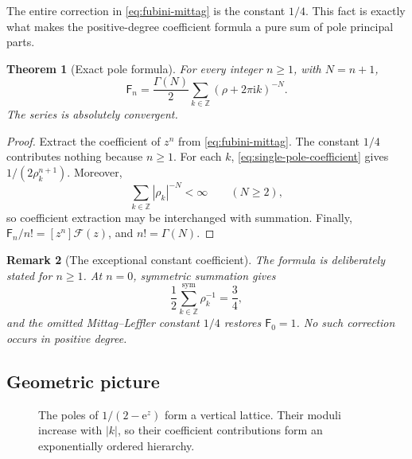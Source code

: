 \documentclass[11pt,oneside]{article}
\numberwithin{equation}{section}
\newtheorem{theorem}{Theorem}[section]
\newtheorem{remark}[theorem]{Remark}
\newcommand{\e}{\mathrm e}
\newcommand{\ii}{\mathrm i}
\newcommand{\Z}{\mathbb Z}
\newcommand{\Fub}{\mathsf F}
\newcommand{\Coeff}[2]{[#1^{#2}]}
\newcommand{\abs}[1]{\left|#1\right|}
\newcommand{\sym}{\mathrm{sym}}
\begin{document}
The entire correction in \cref{eq:fubini-mittag} is the constant \(1/4\).  This fact is exactly what makes the positive-degree coefficient formula a pure sum of pole principal parts.

\begin{theorem}[Exact pole formula]
\label{thm:exact-pole-formula}
For every integer \(n\ge1\), with \(N=n+1\),
\begin{equation}
 \boxed{\displaystyle
 \Fub_n=\frac{\Gamma(N)}{2}
 \sum_{k\in\Z}(\rho+2\pi\ii k)^{-N}.}
 \label{eq:exact-pole-formula}
\end{equation}
The series is absolutely convergent.
\end{theorem}

\begin{proof}
Extract the coefficient of \(z^n\) from \cref{eq:fubini-mittag}.  The constant \(1/4\) contributes nothing because \(n\ge1\).  For each \(k\), \cref{eq:single-pole-coefficient} gives \(1/(2\rho_k^{n+1})\).  Moreover,
\[
 \sum_{k\in\Z}\abs{\rho_k}^{-N}<\infty
 \qquad(N\ge2),
\]
so coefficient extraction may be interchanged with summation.  Finally, \(\Fub_n/n!=\Coeff{z}{n}\mathcal F(z)\), and \(n!=\Gamma(N)\).
\end{proof}

\begin{remark}[The exceptional constant coefficient]
The formula is deliberately stated for \(n\ge1\).  At \(n=0\), symmetric summation gives
\[
 \frac12\sum_{k\in\Z}^{\sym}\rho_k^{-1}=\frac34,
\]
and the omitted Mittag--Leffler constant \(1/4\) restores \(\Fub_0=1\).  No such correction occurs in positive degree.
\end{remark}

\subsection{Geometric picture}

\begin{figure}[ht]
\centering
{}
\caption{The poles of \(1/(2-\e^z)\) form a vertical lattice.  Their moduli increase with \(\abs{k}\), so their coefficient contributions form an exponentially ordered hierarchy.}
\label{fig:pole-lattice}
\end{figure}
\end{document}
